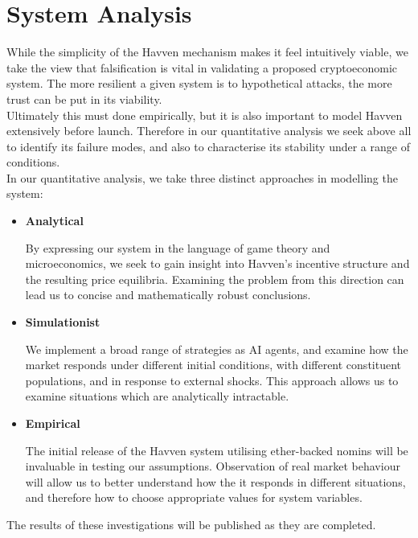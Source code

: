 \section{System Analysis}

While the simplicity of the Havven mechanism makes it feel intuitively
viable, we take the view that falsification is vital in validating a proposed
cryptoeconomic system. The more resilient a given system is to hypothetical
attacks, the more trust can be put in its viability. \\

\noindent Ultimately this must done empirically, but it is also important to
model Havven extensively before launch. Therefore in our quantitative
analysis we seek above all to identify its failure modes, and also to
characterise its stability under a range of conditions.\\

\noindent In our quantitative analysis, we take three distinct approaches in modelling the system:
\begin{itemize}
    \item[] \textbf{Analytical}
    
	By expressing our system in the language of game theory and microeconomics,
	we seek to gain insight into Havven's incentive structure and the resulting
	price equilibria. Examining the problem from this direction can lead us to
	concise and mathematically robust conclusions.

    \item[] \textbf{Simulationist}

    We implement a broad range of strategies as AI agents, and examine how the
    market responds under different initial conditions, with different constituent
	populations, and in response to external shocks. This approach allows us to
	examine situations which are analytically intractable.

    \item[] \textbf{Empirical}

The initial release of the Havven system utilising ether-backed nomins will
be invaluable in testing our assumptions. Observation of real market
behaviour will allow us to better understand how the it responds in different
situations, and therefore how to choose appropriate values for system
variables. \end{itemize}

\noindent The results of these investigations will be published as they are completed.

